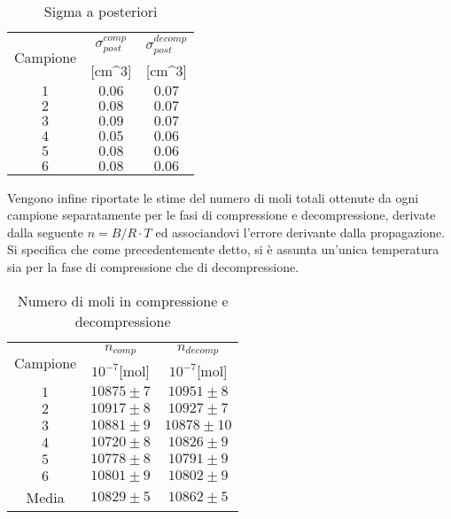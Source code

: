 \documentclass[a4paper,11pt,oneside]{article}
\begin{document}
\begin{table}[h!]
    \centering
    \begin{tabular}{|c|c|c|}
        \hline
        \multirow{2}{*}{Campione} & $\sigma_{post}^{comp}$ & $\sigma_{post}^{decomp}$\\ 
        & [cm^3] & [cm^3]\\ \hline
        \rowcolor[rgb]{0.85,0.85,0.85}$1$ & $0.06$ & $0.07$\\ \hline
        $2$ & $0.08$ & $0.07$\\ \hline
        \rowcolor[rgb]{0.85,0.85,0.85}$3$ & $0.09$ & $0.07$\\ \hline
        $4$ & $0.05$ & $0.06$\\ \hline
        \rowcolor[rgb]{0.85,0.85,0.85}$5$ & $0.08$ & $0.06$\\ \hline
        $6$ & $0.08$ & $0.06$\\ \hline
    \end{tabular}
    \caption{Sigma a posteriori}
    \label{tab:sigma_post}
\end{table}



Vengono infine riportate le stime del numero di moli totali ottenute da ogni campione separatamente per le fasi di compressione e decompressione, derivate dalla seguente $n=B/R \cdot T$ ed associandovi l'errore derivante dalla propagazione. Si specifica che come precedentemente detto, si è assunta un'unica temperatura sia per la fase di compressione che di decompressione.
\begin{table}[h!]
    \centering
    \begin{tabular}{|c|c|c|}
        \hline
        \multirow{2}{*}{Campione} & $n_{comp}$ & $n_{decomp}$\\ 
        & $10^{-7}$[mol] & $10^{-7}$[mol]\\ \hline
         \rowcolor[rgb]{0.85,0.85,0.85}$1$ & $10875\pm7$ &  $10951\pm8$\\ \hline
        $2$ & $10917\pm8$ &  $10927\pm7$\\ \hline
         \rowcolor[rgb]{0.85,0.85,0.85}$3$ & $10881\pm9$ &  $10878\pm10$\\ \hline
        $4$ & $10720\pm8$ &  $10826\pm9$\\ \hline
         \rowcolor[rgb]{0.85,0.85,0.85}$5$ & $10778\pm8$ &  $10791\pm9$\\ \hline
        $6$ & $10801\pm9$ &  $10802\pm9$\\ \hline
         \rowcolor[rgb]{0.85,0.85,0.85}Media & $10829\pm5$   & $10862\pm5$\\ \hline
    \end{tabular}
    \caption{Numero di moli in compressione e decompressione}
    \label{tab:n_moli}
\end{table}
\end{document}
